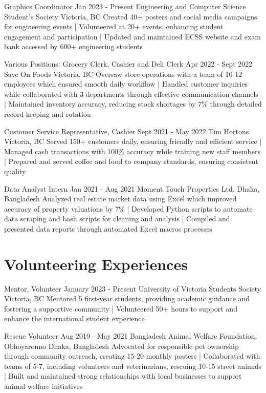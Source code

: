 \documentclass[a4paper,10pt]{article}
\begin{document}
\relevantexperience
{Graphics Coordinator}
{Jan 2023 - Present}
{Engineering and Computer Science Student’s Society}
{Victoria, BC}
{Created 40+ posters and social media campaigns for engineering events 
| Volunteered at 20+ events, enhancing student engagement and participation 
| Updated and maintained ECSS website and exam bank accessed by 600+ engineering students
}

\relevantexperience
{Various Positions: Grocery Clerk, Cashier and Deli Clerk}
{Apr 2022 - Sept 2022}
{Save On Foods}
{Victoria, BC}
{Oversaw store operations with a team of 10-12 employees which ensured smooth daily workflow 
| Handled customer inquiries while collaborated with 3 departments through effective communication channels 
| Maintained inventory accuracy, reducing stock shortages by 7\% through detailed record-keeping and rotation
}

\relevantexperience
{Customer Service Representative, Cashier}
{Sept 2021 - May 2022}
{Tim Hortons}
{Victoria, BC}
{Served 150+ customers daily, ensuring friendly and efficient service 
| Managed cash transactions with 100\% accuracy while training new staff members 
| Prepared and served coffee and food to company standards, ensuring consistent quality
}

\relevantexperience
{Data Analyst Intern}
{Jan 2021 - Aug 2021}
{Moment Touch Properties Ltd.}
{Dhaka, Bangladesh}
{Analyzed real estate market data using Excel which improved accuracy of property valuations by 7\% 
| Developed Python scripts to automate data scraping and bash scripts for cleaning and analysis
| Compiled and presented data reports through automated Excel macros processes
}

\section{Volunteering Experiences}

\relevantexperience
{Mentor, Volunteer}
{January 2023 - Present}
{University of Victoria Students Society}
{Victoria, BC}
{Mentored 5 first-year students, providing academic guidance and fostering a supportive community
| Volunteered 50+ hours to support and enhance the international student experience 
}

\relevantexperience
{Rescue Volunteer}
{Aug 2019 - May 2021}
{Bangladesh Animal Welfare Foundation, Obhoyaronno}
{Dhaka, Bangladesh}
{Advocated for responsible pet ownership through community outreach, creating 15-20 monthly posters 
| Collaborated with teams of 5-7, including volunteers and veterinarians, rescuing 10-15 street animals 
| Built and maintained strong relationships with local businesses to support animal welfare initiatives
}
\end{document}
